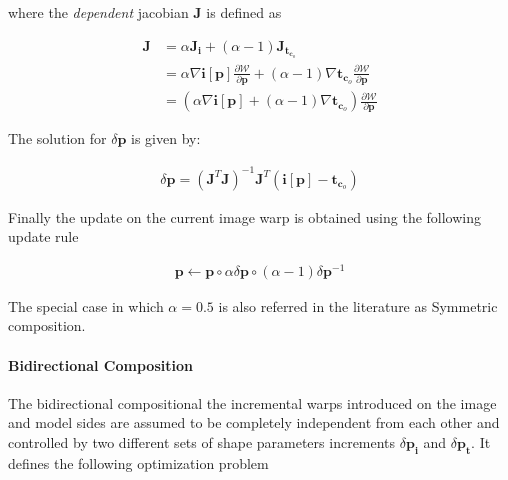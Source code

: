 where the \emph{dependent} jacobian $\mathbf{J}$ is defined as

\begin{equation}
	\begin{aligned}
		\mathbf{J} & = \alpha \mathbf{J}_{\mathbf{i}} + (\alpha - 1) \mathbf{J}_{\mathbf{t}_{\mathbf{c}_o}}
		\\
		& = \alpha \nabla \mathbf{i}[\mathbf{p}] \frac{\partial \mathcal{W}}{\partial \mathbf{p}} + 
		(\alpha - 1) \nabla \mathbf{t}_{\mathbf{c}_o} \frac{\partial \mathcal{W}}{\partial \mathbf{p}}
		\\
		& = \left( \alpha \nabla \mathbf{i}[\mathbf{p}] + (\alpha - 1) \nabla \mathbf{t}_{\mathbf{c}_o} \right) \frac{\partial \mathcal{W}}{\partial \mathbf{p}}
	\end{aligned}
\end{equation}

The solution for $\delta \mathbf{p}$ is given by:

\begin{equation}
	\begin{aligned}
		\delta \mathbf{p} = \left( \mathbf{J}^T \mathbf{J} \right)^{-1} \mathbf{J}^T \left( \mathbf{i}[\mathbf{p}] - \mathbf{t}_{\mathbf{c}_o} \right)
	\end{aligned}
\end{equation}

Finally the update on the current image warp is obtained using the following update rule

\begin{equation}
	\begin{aligned}
		\mathbf{p} \leftarrow \mathbf{p} \circ \alpha \delta \mathbf{p} \circ (\alpha -1) \delta \mathbf{p}^{-1} 
	\end{aligned}
\end{equation}

The special case in which $\alpha = 0.5$ is also referred in the literature as Symmetric composition.

\paragraph{Bidirectional Composition}

The bidirectional compositional the  incremental  warps  introduced  on  the  image and model sides are assumed to be completely independent from each other and controlled by two different sets of shape parameters increments $\delta \mathbf{p}_{\mathbf{i}}$ and $\delta \mathbf{p}_{\mathbf{t}}$. It defines the following optimization problem


